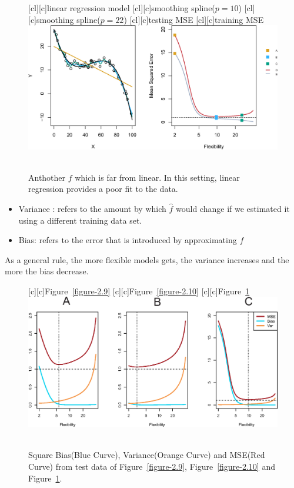     \documentclass[12pt,fleqn,a4paper]{article}
\theoremstyle{definition}
\theoremstyle{plain}
\begin{document}
\begin{figure}[H]
\centering
{}[cl][c]{\tiny linear regression model}
[cl][c]{\tiny smoothing spline($p=10$)}
[cl][c]{\tiny smoothing spline($p=22$)}
[cl][c]{\tiny testing MSE}
[cl][c]{\tiny training MSE}
\includegraphics[scale=0.7]{images//2_11.eps}
\\~\\
\caption{Anthother $f$ which is far from linear. In this setting, linear regression provides a poor fit to the data.}\label{figure-2.11}
\end{figure}

\begin{itemize}
\item Variance : refers to the amount by which $\hat{f}$ would change if we estimated it using a different training data set.
\item Bias: refers to the error that is introduced by approximating $f$
\end{itemize}

As a general rule, the more flexible models gets, the variance increases and the more the bias decrease.

\begin{figure}[H]
\centering
{}[c][c]{\footnotesize Figure~\ref{figure-2.9}}
[c][c]{\footnotesize Figure~\ref{figure-2.10}}
[c][c]{\footnotesize Figure~\ref{figure-2.11}}
\includegraphics[scale=0.7]{images//2_12.eps}
\\~\\
\caption{Square Bias(Blue Curve), Variance(Orange Curve) and MSE(Red Curve) from test data of Figure~\ref{figure-2.9}, Figure~\ref{figure-2.10} and Figure~\ref{figure-2.11}.}\label{figure-2.12}
\end{figure}
\end{document}
